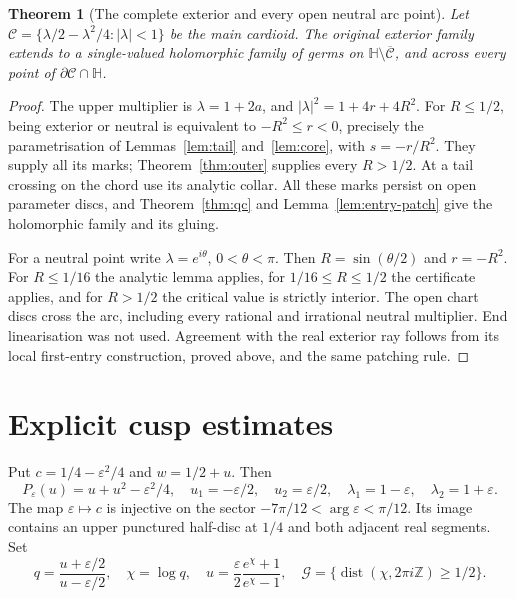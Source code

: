 \documentclass[11pt]{article}
\newtheorem{theorem}{Theorem}
\newcommand{\HH}{\mathbb H}
\begin{document}
\begin{theorem}[The complete exterior and every open neutral arc point]
\label{thm:exterior}
Let $\mathcal C=\{\lambda/2-\lambda^2/4:|\lambda|<1\}$ be the main
cardioid. The original exterior family extends to a single-valued
holomorphic family of germs on $\HH\setminus\overline{\mathcal C}$,
and across every point of $\partial\mathcal C\cap\HH$.
\end{theorem}
\begin{proof}
The upper multiplier is $\lambda=1+2a$, and
$|\lambda|^2=1+4r+4R^2$. For $R\le1/2$, being exterior or neutral is
equivalent to $-R^2\le r<0$, precisely the parametrisation of
Lemmas~\ref{lem:tail} and~\ref{lem:core}, with $s=-r/R^2$.
They supply all its marks; Theorem~\ref{thm:outer} supplies every $R>1/2$.
At a tail crossing on the chord use its analytic collar. All these marks
persist on open parameter discs, and Theorem~\ref{thm:qc} and
Lemma~\ref{lem:entry-patch} give the holomorphic family and its gluing.

For a neutral point write $\lambda=e^{i\theta}$, $0<\theta<\pi$.
Then $R=\sin(\theta/2)$ and $r=-R^2$. For $R\le1/16$ the analytic
lemma applies, for $1/16\le R\le1/2$ the certificate applies, and
for $R>1/2$ the critical value is strictly interior. The open chart
discs cross the arc, including every rational and irrational neutral
multiplier. End linearisation was not used.
Agreement with the real exterior ray follows from its local first-entry
construction, proved above, and the same patching rule.
\end{proof}

\section{Explicit cusp estimates}
Put $c=1/4-\varepsilon^2/4$ and $w=1/2+u$. Then
\[
 P_\varepsilon(u)=u+u^2-\varepsilon^2/4,\quad
 u_1=-\varepsilon/2,\quad u_2=\varepsilon/2,\quad
 \lambda_1=1-\varepsilon,\quad\lambda_2=1+\varepsilon.
\]
The map $\varepsilon\mapsto c$ is injective on the sector
$-7\pi/12<\arg\varepsilon<\pi/12$. Its image contains an upper punctured
half-disc at $1/4$ and both adjacent real segments.
Set
\[
 q=\frac{u+\varepsilon/2}{u-\varepsilon/2},\quad \chi=\log q,
 \quad u=\frac{\varepsilon}{2}\frac{e^\chi+1}{e^\chi-1},
 \quad \mathcal G=\{\operatorname{dist}(\chi,2\pi i\mathbb Z)\ge1/2\}.
\]
\end{document}
